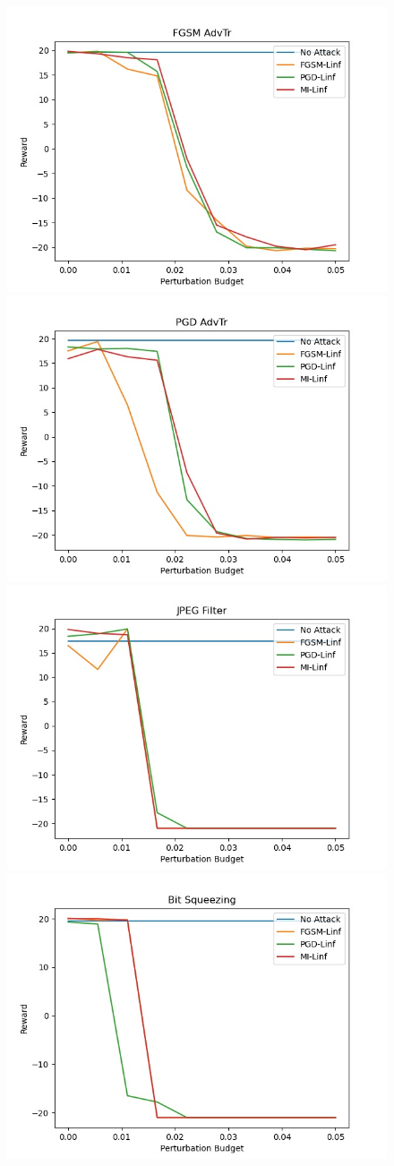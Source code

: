 \begin{figure}
  \centering
    {\includegraphics[width=0.49\linewidth]{images/exp3/targeted/FGSM_AdvTr.jpg}}
    {\includegraphics[width=0.49\linewidth]{images/exp3/targeted/PGD_AdvTr.jpg}}
    {\includegraphics[width=0.49\linewidth]{images/exp3/targeted/JPEG_Filter.jpg}}
    {\includegraphics[width=0.49\linewidth]{images/exp3/targeted/Bit_Squeezing.jpg}}

\end{figure}
